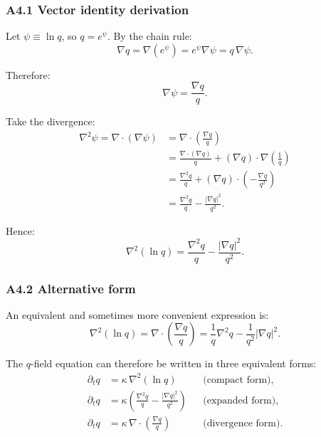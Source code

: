 \documentclass[reprint]{revtex4-2}
\begin{document}
\subsubsection{A4.1 Vector identity derivation}

Let $\psi \equiv \ln q$, so $q = e^\psi$. By the chain rule:
\begin{equation}
\nabla q = \nabla(e^\psi) = e^\psi \nabla\psi = q\,\nabla\psi.
\end{equation}

Therefore:
\begin{equation}
\nabla\psi = \frac{\nabla q}{q}.
\end{equation}

Take the divergence:
\begin{align}
\nabla^2\psi = \nabla\cdot(\nabla\psi) &= \nabla\cdot\left(\frac{\nabla q}{q}\right)\\
&= \frac{\nabla\cdot(\nabla q)}{q} + (\nabla q)\cdot\nabla\left(\frac{1}{q}\right)\\
&= \frac{\nabla^2 q}{q} + (\nabla q)\cdot\left(-\frac{\nabla q}{q^2}\right)\\
&= \frac{\nabla^2 q}{q} - \frac{|\nabla q|^2}{q^2}.
\end{align}

Hence:
\begin{equation}
\boxed{\nabla^2(\ln q) = \frac{\nabla^2 q}{q} - \frac{|\nabla q|^2}{q^2}}.
\label{eq:laplacian_expansion}
\end{equation}

\subsubsection{A4.2 Alternative form}

An equivalent and sometimes more convenient expression is:
\begin{equation}
\nabla^2(\ln q) = \nabla\cdot\left(\frac{\nabla q}{q}\right) = \frac{1}{q}\nabla^2 q - \frac{1}{q^2}|\nabla q|^2.
\end{equation}

The $q$-field equation can therefore be written in three equivalent forms:
\begin{align}
\partial_t q &= \kappa\,\nabla^2(\ln q) &&\text{(compact form)},\\
\partial_t q &= \kappa\left(\frac{\nabla^2 q}{q} - \frac{|\nabla q|^2}{q^2}\right) &&\text{(expanded form)},\\
\partial_t q &= \kappa\,\nabla\cdot\left(\frac{\nabla q}{q}\right) &&\text{(divergence form)}.
\end{align}
\end{document}
